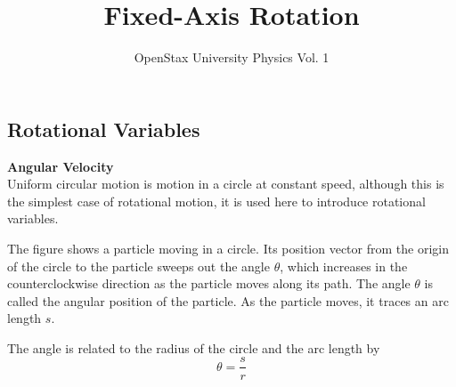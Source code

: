 \documentclass[a4paper]{article}
\title{Fixed-Axis Rotation}
\author{OpenStax University Physics Vol. 1}
\let\bf\textbf
\def\centerarc[#1](#2)(#3:#4:#5){\draw[#1] ($(#2)+({#5*cos(#3)},{#5*sin(#3)})$) arc (#3:#4:#5)}
\begin{document}
\setcounter{section}{10}
\maketitle
\subsection{Rotational Variables}
\noindent\bf{Angular Velocity}
\vspace{2mm}\\
Uniform circular motion is motion in a circle at constant speed, although this is the simplest case of rotational motion, it is used here to introduce rotational variables.\par
The figure shows a particle moving in a circle. Its position vector from the origin of the circle to the particle sweeps out the angle $\theta$, which increases in the counterclockwise direction as the particle moves along its path. The angle $\theta$ is called the angular position of the particle. As the particle moves, it traces an arc length $s$.
\begin{center}
\end{center}
The angle is related to the radius of the circle and the arc length by 
\begin{equation}
    \theta = \frac{s}{r}
\end{equation}
\end{document}
